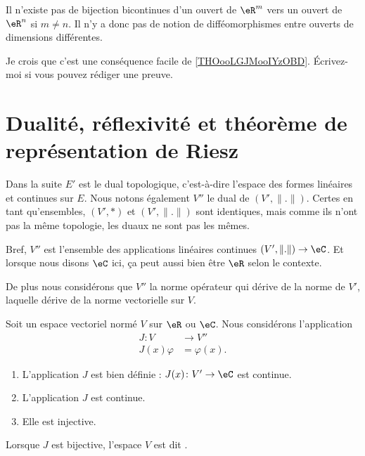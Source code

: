 \begin{remark}  %
	Il n'existe pas de bijection bicontinues d'un ouvert de \( \eR^m\) vers un ouvert de \( \eR^n\) si \( m\neq n\). Il n'y a donc pas de notion de difféomorphismes entre ouverts de dimensions différentes.

	Je crois que c'est une conséquence facile de \ref{THOooLGJMooIYzOBD}. Écrivez-moi si vous pouvez rédiger une preuve.
\end{remark}


\section{Dualité, réflexivité et théorème de représentation de Riesz}

Dans la suite \( E'\) est le dual topologique, c'est-à-dire l'espace des formes linéaires et continues sur \( E\). Nous notons également \( V''\) le dual de \( (V',\| . \|)\). Certes en tant qu'ensembles, \( (V',*)\) et \( (V',\| . \|) \) sont identiques, mais comme ils n'ont pas la même topologie, les duaux ne sont pas les mêmes.

Bref, \( V''\) est l'ensemble des applications linéaires continues \( (V',\| . \|)\to \eC\). Et lorsque nous disons \( \eC\) ici, ça peut aussi bien être \( \eR\) selon le contexte.

De plus nous considérons que \( V''\) la norme opérateur qui dérive de la norme de \( V'\), laquelle dérive de la norme vectorielle sur \( V\).

\begin{propositionDef}      \label{PROPooMAQSooCGFBBM}
	Soit un espace vectoriel normé \( V\) sur \( \eR\) ou \( \eC\). Nous considérons l'application
	\begin{equation}		\label{EQooRQIMooZdVkDO}
		\begin{aligned}
			J\colon V   & \to V''       \\
			J(x)\varphi & = \varphi(x).
		\end{aligned}
	\end{equation}
	\begin{enumerate}
		\item       \label{ITEMooNVVSooNFXgnE}
		      L'application \( J\) est bien définie : \( J(x)\colon V'\to \eC\) est continue.
		\item       \label{ITEMooKURHooZZWpbu}
		      L'application \( J\) est continue.
		\item       \label{ITEMooTFYVooKhMOjp}
		      Elle est injective.
	\end{enumerate}

	Lorsque \( J\) est bijective, l'espace \( V\) est dit .
\end{propositionDef}

